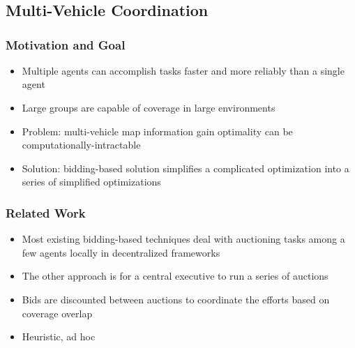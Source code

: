 \documentclass[11pt,professionalfonts,hyperref={pdftex,pdfpagemode=none,pdfstartview=FitH}]{beamer}
\begin{document}
\section*{}
\subsection*{Multi-Vehicle Coordination}

\begin{frame}
\frametitle{Motivation and Goal}

\begin{itemize}
	\item Multiple agents can accomplish tasks faster and more reliably than a single agent
	\item Large groups are capable of coverage in large environments
	\item Problem: multi-vehicle map information gain optimality can be computationally-intractable
	\item Solution: bidding-based solution simplifies a complicated optimization into a series of simplified optimizations
\end{itemize}

\end{frame}

\begin{frame}
\frametitle{Related Work}

\begin{itemize}
	\item Most existing bidding-based techniques deal with auctioning tasks among a few agents locally in decentralized frameworks
	\item The other approach is for a central executive to run a series of auctions
	\item Bids are discounted between auctions to coordinate the efforts based on coverage overlap
	\item Heuristic, ad hoc
\end{itemize}

\end{frame}
\end{document}
